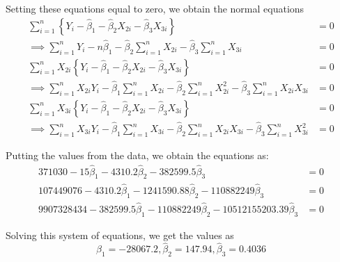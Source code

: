 \documentclass[12pt, oneside]{article}
\begin{document}
\begin{enumerate}
{    Setting these equations equal to zero, we obtain the normal equations
    \begin{align*}
        \sum_{i=1}^{n} \left\{ Y_i - \widehat{\beta}_1 - \widehat{\beta}_2 X_{2i} - \widehat{\beta}_3 X_{3i} \right\} &= 0 \\
        \implies \sum_{i=1}^{n} Y_i - n \widehat{\beta}_1 - \widehat{\beta}_2 \sum_{i=1}^{n} X_{2i} - \widehat{\beta}_3 \sum_{i=1}^{n} X_{3i} &= 0 \\
        \sum_{i=1}^{n} X_{2i} \left\{ Y_i - \widehat{\beta}_1 - \widehat{\beta}_2 X_{2i} - \widehat{\beta}_3 X_{3i} \right\} &= 0  \\
        \implies \sum_{i=1}^{n} X_{2i} Y_i - \widehat{\beta}_1 \sum_{i=1}^{n} X_{2i} - \widehat{\beta}_2 \sum_{i=1}^{n} X_{2i}^2 - \widehat{\beta}_3 \sum_{i=1}^{n} X_{2i} X_{3i} &= 0 \\
        \sum_{i=1}^{n} X_{3i} \left\{ Y_i - \widehat{\beta}_1 - \widehat{\beta}_2 X_{2i} - \widehat{\beta}_3 X_{3i} \right\} &= 0 \\
        \implies \sum_{i=1}^{n} X_{3i} Y_i - \widehat{\beta}_1 \sum_{i=1}^{n} X_{3i} - \widehat{\beta}_2 \sum_{i=1}^{n} X_{2i} X_{3i} - \widehat{\beta}_3 \sum_{i=1}^{n} X_{3i}^2 &= 0
    \end{align*}

    Putting the values from the data, we obtain the equations as:
    \begin{align*}
        371030 - 15 \widehat{\beta}_1 - 4310.2 \widehat{\beta}_2 - 382599.5 \widehat{\beta}_3 &= 0 \\
        107449076 - 4310.2 \widehat{\beta}_1 - 1241590.88 \widehat{\beta}_2 - 110882249 \widehat{\beta}_3 &= 0 \\
        9907328434 - 382599.5 \widehat{\beta}_1 - 110882249 \widehat{\beta}_2 - 10512155203.39 \widehat{\beta}_3 &= 0
    \end{align*}

    Solving this system of equations, we get the values as
    \[\widehat{\beta}_1 = -28067.2, \widehat{\beta}_2 = 147.94, \widehat{\beta}_3 = 0.4036\]

}
\end{enumerate}
\end{document}
